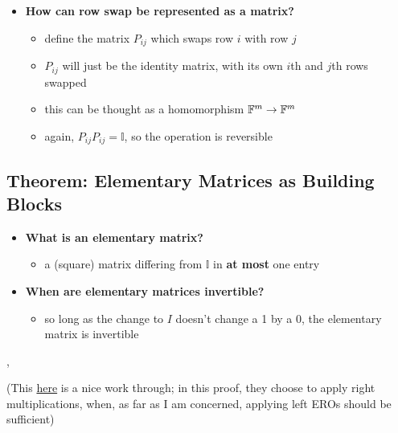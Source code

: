 \documentclass{exam}
\begin{document}
\begin{itemize}
\begin{itemize}
    \end{itemize}
    \item \textbf{How can row swap be represented as a matrix?}
    \begin{itemize}
        \item define the matrix $P_{ij}$ which swaps row $i$ with row $j$
        \item $P_{ij}$ will just be the identity matrix, with its own $i$th and $j$th rows swapped
        \item this can be thought as a homomorphism $\mathbb{F}^m \to \mathbb{F}^m$
        \item again, $P_{ij}P_{ij} = \mathbb{I}$, so the operation is reversible
    \end{itemize}
\end{itemize}

\subsection{Theorem: Elementary Matrices as Building Blocks}

\begin{itemize}
    \item \textbf{What is an elementary matrix?}
    \begin{itemize}
        \item a (square) matrix differing from $\mathbb{I}$ in \textbf{at most} one entry
    \end{itemize}
    \item \textbf{When are elementary matrices invertible?}
    \begin{itemize}
        \item so long as the change to $I$ doesn't change a 1 by a 0, the elementary matrix is invertible
    \end{itemize}
\end{itemize}

\sep 


(This \href{https://youtu.be/pMp8RfWtPwQ}{here} is a nice work through; in this proof, they choose to apply right multiplications, when, as far as I am concerned, applying left EROs should be sufficient)
\end{document}
